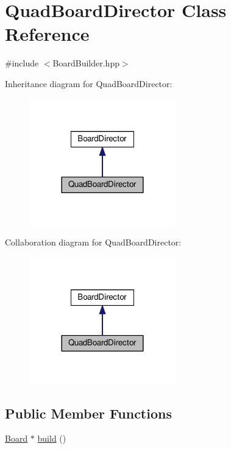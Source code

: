 \hypertarget{classQuadBoardDirector}{}\section{Quad\+Board\+Director Class Reference}
\label{classQuadBoardDirector}


{\ttfamily \#include $<$Board\+Builder.\+hpp$>$}



Inheritance diagram for Quad\+Board\+Director\+:\nopagebreak
\begin{figure}[H]
\begin{center}
\leavevmode
\includegraphics[width=180pt]{classQuadBoardDirector__inherit__graph}
\end{center}
\end{figure}


Collaboration diagram for Quad\+Board\+Director\+:\nopagebreak
\begin{figure}[H]
\begin{center}
\leavevmode
\includegraphics[width=180pt]{classQuadBoardDirector__coll__graph}
\end{center}
\end{figure}
\subsection*{Public Member Functions}
\begin{DoxyCompactItemize}
\item 
\hyperlink{classBoard}{Board} $\ast$ \hyperlink{classQuadBoardDirector_a4f43bce7847e996d4a1043c83d81638c}{build} ()
\end{DoxyCompactItemize}


